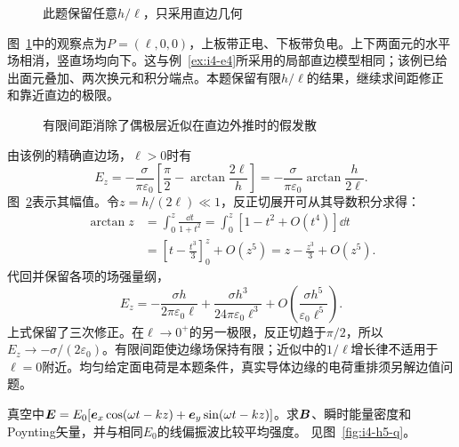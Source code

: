 \begin{figure}[H]\centering
{}
\caption{此题保留任意$h/\ell$，只采用直边几何}\label{fig:i4-h4-q}
\end{figure}
\begin{solution}
图~\ref{fig:i4-h4-q}中的观察点为$P=(\ell,0,0)$，上板带正电、下板带负电。上下两面元的水平场相消，竖直场均向下。这与例~\ref{ex:i4-e4}所采用的局部直边模型相同；该例已给出面元叠加、两次换元和积分端点。本题保留有限$h/\ell$的结果，继续求间距修正和靠近直边的极限。
\begin{figure}[H]\centering
{}
\caption{有限间距消除了偶极层近似在直边外推时的假发散}\label{fig:i4-h4-s}
\end{figure}
由该例的精确直边场，$\ell>0$时有
\[
\boxed{E_z=-\frac{\sigma}{\pi\varepsilon_0}
\left[\frac\pi2-\arctan\frac{2\ell}{h}\right]
=-\frac{\sigma}{\pi\varepsilon_0}\arctan\frac h{2\ell}}.
\]
图~\ref{fig:i4-h4-s}表示其幅值。令$z=h/(2\ell)\ll1$，反正切展开可从其导数积分求得：
\[\begin{aligned}
\arctan z&=\int_0^z\frac{\dd t}{1+t^2}
=\int_0^z[1-t^2+O(t^4)]\dd t\\
&=\left[t-\frac{t^3}{3}\right]_0^z+O(z^5)
=z-\frac{z^3}{3}+O(z^5).
\end{aligned}\]
代回并保留各项的场强量纲，
\[
E_z=-\frac{\sigma h}{2\pi\varepsilon_0\ell}
+\frac{\sigma h^3}{24\pi\varepsilon_0\ell^3}
+O\left(\frac{\sigma h^5}{\varepsilon_0\ell^5}\right).
\]
上式保留了三次修正。在$\ell\to0^+$的另一极限，反正切趋于$\pi/2$，所以$E_z\to-\sigma/(2\varepsilon_0)$。有限间距使边缘场保持有限；近似中的$1/\ell$增长律不适用于$\ell=0$附近。均匀给定面电荷是本题条件，真实导体边缘的电荷重排须另解边值问题。
\end{solution}

\begin{exercise}[圆偏振平面波的能量]\label{ex:i4-h5}
真空中$\bm{E}=E_0[\bm{e}_x\cos(\omega t-kz)+\bm{e}_y\sin(\omega t-kz)]$。求$\bm{B}$、瞬时能量密度和Poynting矢量，并与相同$E_0$的线偏振波比较平均强度。 见图~\ref{fig:i4-h5-q}。
\end{exercise}

